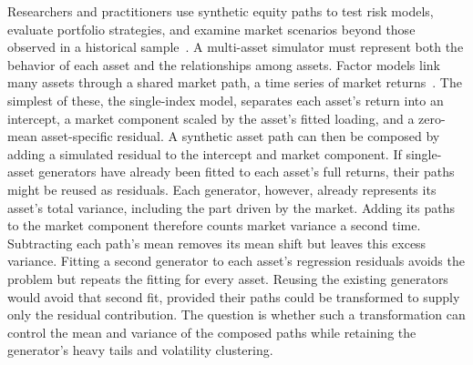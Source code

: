Researchers and practitioners use synthetic equity paths to test risk
models, evaluate portfolio strategies, and examine market scenarios
beyond those observed in a historical sample~\cite{assefaEtAl2020,
jordonEtAl2022}. A multi-asset simulator must represent both the
behavior of each asset and the relationships among assets. Factor
models link many assets through a shared market path, a time series of
market returns~\cite{sharpe1963, rossAPT1976, famaFrench1993}. The
simplest of these, the single-index model, separates each asset's
return into an intercept, a market component scaled by the asset's
fitted loading, and a zero-mean asset-specific residual. A synthetic
asset path can then be composed by adding a simulated residual to the
intercept and market component. If single-asset generators have
already been fitted to each asset's full returns, their paths might
be reused as residuals. Each generator, however, already represents
its asset's total variance, including the part driven by the market.
Adding its paths to the market component therefore counts market
variance a second time. Subtracting each path's mean removes its mean
shift but leaves this excess variance. Fitting a second generator to
each asset's regression residuals avoids the problem but repeats the
fitting for every asset. Reusing the existing generators would avoid
that second fit, provided their paths could be transformed to supply
only the residual contribution. The question is whether such a
transformation can control the mean and variance of the composed paths
while retaining the generator's heavy tails and volatility clustering.

